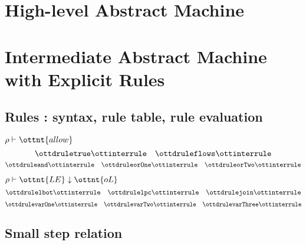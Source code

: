 \documentclass{article}
\begin{document}

\newpage
\section*{High-level Abstract Machine}

\ottdefnsAbstractHighLevelSmallStep


\newpage
\section*{Intermediate Abstract Machine
  with Explicit Rules}

\subsection*{Rules : syntax, rule table, rule evaluation}

\ottgrammartabular{
\ottLE\ottinterrule
\ottBE\ottinterrule
\ottRHS\ottinterrule
\ottrho\ottinterrule
}

\ottfundefnsRule

\begin{ottdefnblock}[#1]{$ \rho  \vdash   \ottnt{allow} $}{}
\[ \ottdruletrue \ottinterrule
   \quad \ottdruleflows\ottinterrule \]
\[ \ottdruleand\ottinterrule 
   \quad \ottdruleorOne\ottinterrule
   \quad \ottdruleorTwo\ottinterrule \]
\end{ottdefnblock}

\clearpage
\begin{ottdefnblock}[#1]{$ \rho  \vdash \ottnt{LE} \downarrow  \ottnt{oL} $}{}
\small 
\[ \ottdrulelbot \ottinterrule
   \quad \ottdrulelpc \ottinterrule
   \quad \ottdrulejoin \ottinterrule \]
\[ \ottdrulevarOne \ottinterrule
   \quad \ottdrulevarTwo \ottinterrule
   \quad \ottdrulevarThree \ottinterrule \]
\end{ottdefnblock}

\ottdefnrunXXtmr

\clearpage

\subsection*{Small step relation}

\ottdefnsAbstractExplicitSmallStep
\end{document}

